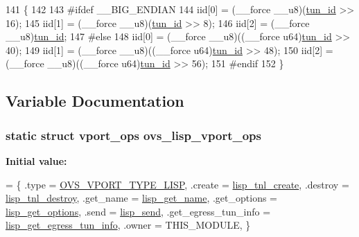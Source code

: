 \begin{DoxyCode}
141 \{
142 
143 \textcolor{preprocessor}{#ifdef \_\_BIG\_ENDIAN}
144     iid[0] = (\_\_force \_\_u8)(\hyperlink{flow_8h_aba5027d7a3d96f0f58dd8e607365934b}{tun\_id} >> 16);
145     iid[1] = (\_\_force \_\_u8)(\hyperlink{flow_8h_aba5027d7a3d96f0f58dd8e607365934b}{tun\_id} >> 8);
146     iid[2] = (\_\_force \_\_u8)\hyperlink{flow_8h_aba5027d7a3d96f0f58dd8e607365934b}{tun\_id};
147 \textcolor{preprocessor}{#else}
148     iid[0] = (\_\_force \_\_u8)((\_\_force u64)\hyperlink{flow_8h_aba5027d7a3d96f0f58dd8e607365934b}{tun\_id} >> 40);
149     iid[1] = (\_\_force \_\_u8)((\_\_force u64)\hyperlink{flow_8h_aba5027d7a3d96f0f58dd8e607365934b}{tun\_id} >> 48);
150     iid[2] = (\_\_force \_\_u8)((\_\_force u64)\hyperlink{flow_8h_aba5027d7a3d96f0f58dd8e607365934b}{tun\_id} >> 56);
151 \textcolor{preprocessor}{#endif}
152 \}
\end{DoxyCode}


\subsection{Variable Documentation}
\hypertarget{vport-lisp_8c_a758306cfbd9fe092cc094dbf165e5cf7}{}
\subsubsection[{ovs\+\_\+lisp\+\_\+vport\+\_\+ops}]{\setlength{\rightskip}{0pt plus 5cm}static struct {\bf vport\+\_\+ops} ovs\+\_\+lisp\+\_\+vport\+\_\+ops\hspace{0.3cm}{\ttfamily [static]}}\label{vport-lisp_8c_a758306cfbd9fe092cc094dbf165e5cf7}
{\bfseries Initial value\+:}
\begin{DoxyCode}
= \{
    .type           = \hyperlink{openvswitch_8h_a9a1b861aa99bd83177a2b10b34745b0aa99a33a2b25d9e9de2bdba0544804122e}{OVS\_VPORT\_TYPE\_LISP},
    .create         = \hyperlink{vport-lisp_8c_aeaf8548971b28354b0c5b67853008ebb}{lisp\_tnl\_create},
    .destroy        = \hyperlink{vport-lisp_8c_a29757c9680cfc5547ff8b58fc9d39f57}{lisp\_tnl\_destroy},
    .get\_name       = \hyperlink{vport-lisp_8c_a9b17408cfe8b9c4999729e709eda60c8}{lisp\_get\_name},
    .get\_options        = \hyperlink{vport-lisp_8c_a54dce33d8291b4f7f816d882b13c3cc3}{lisp\_get\_options},
    .send           = \hyperlink{vport-lisp_8c_a3a50252974d93009f1c1204799ef7ba0}{lisp\_send},
    .get\_egress\_tun\_info    = \hyperlink{vport-lisp_8c_a38f0b18b384c833b501a23e942fa2a07}{lisp\_get\_egress\_tun\_info},
    .owner          = THIS\_MODULE,
\}
\end{DoxyCode}
